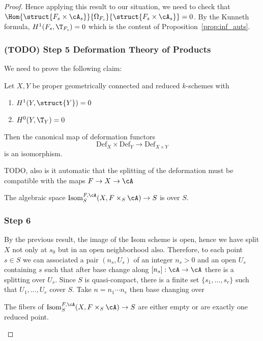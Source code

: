 \documentclass[12pt]{article}
\begin{document}
\begin{proof}
Hence applying this result to our situation, we need to check that $\Hom{\struct{F_s \times \cA_s}}{\Omega_{F_s}}{\struct{F_s \times \cA_s}} =  0$. By the Kunneth formula, $H^1(F_s, \T_{F_s}) = 0$ which is the content of Proposition~\ref{prop:inf_auts}.

\subsubsection{(TODO) Step 5 Deformation Theory of Products}

We need to prove the following claim:

\newcommand{\Def}{\mathrm{Def}}

\begin{prop}
Let $X,Y$ be proper geometrically connected and reduced $k$-schemes with
\begin{enumerate}
\item $H^1(Y, \struct{Y}) = 0$
\item $H^0(Y, \T_Y) = 0$
\end{enumerate}
Then the canonical map of deformation functors
\[ \Def_X \times \Def_Y \to \Def_{X \times Y} \]
is an isomorphism.
\end{prop}

{\color{red} TODO, also is it automatic that the splitting of the deformation must be compatible with the maps $F \to X \to \cA$ }

\begin{cor}
The algebraic space $\Isom_S^{F,\cA}(X, F \times_S \cA) \to S$
is \etale over $S$.
\end{cor}

\subsubsection{Step 6}

By the previous result, the image of the Isom scheme is open, hence we have split $X$ not only at $s_0$ but in an open neighborhood also. Therefore, to each point $s \in S$ we can associated a pair $(n_s, U_s)$ of an integer $n_s > 0$ and an open $U_s$ containing $s$ such that after base change along $[n_s] : \cA \to \cA$ there is a splitting over $U_s$. Since $S$ is quasi-compact, there is a finite set $\{ s_1, \dots, s_r \}$ such that $U_1, \dots, U_r$ cover $S$. Take $n = n_1 \cdots n_r$ then base changing over 

\begin{prop}
The fibers of $\Isom_S^{F,\cA}(X, F \times_S \cA) \to S$ are either empty or are exactly one reduced point. 
\end{prop}


\end{proof}
\end{document}
